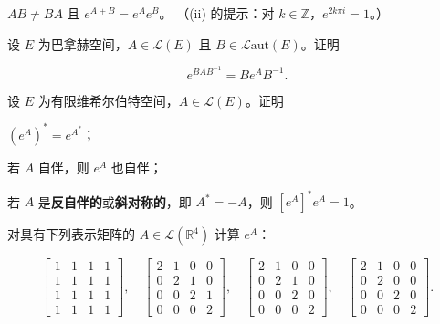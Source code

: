 \begin{exercises}
\begin{subitems}
\item

$ AB \ne BA $ 且 $ e^{A+B} = e^{A}e^{B} $。
（(ii) 的提示：对 $ k \in \mathbb{Z} $，$ e^{2k\pi i} = 1 $。）

\end{subitems}

\item

设 $ E $ 为巴拿赫空间，$ A \in \mathcal{L}(E) $ 且 $ B \in \mathcal{L}\mathrm{aut}(E) $。证明

\[
e^{BAB^{-1}} = Be^{A}B^{-1} .
\]
\item

设 $ E $ 为有限维希尔伯特空间，$ A \in \mathcal{L}(E) $。证明

\begin{subitems}
\item

$ (e^{A})^{*} = e^{A^{*}} $；

\item

若 $ A $ 自伴，则 $ e^{A} $ 也自伴；

\item

若 $ A $ 是\textbf{反自伴的}或\textbf{斜对称的}，即 $ A^{*} = -A $，则 $ [e^{A}]^{*}e^{A} = 1 $。

\end{subitems}

\item

对具有下列表示矩阵的 $ A \in \mathcal{L}(\mathbb{R}^{4}) $ 计算 $ e^{A} $：

\begin{equation*}
\begin{bmatrix} 1 & 1 & 1 & 1 \\ 1 & 1 & 1 & 1 \\ 1 & 1 & 1 & 1 \\ 1 & 1 & 1 & 1 \end{bmatrix} , \quad \begin{bmatrix} 2 & 1 & 0 & 0 \\ 0 & 2 & 1 & 0 \\ 0 & 0 & 2 & 1 \\ 0 & 0 & 0 & 2 \end{bmatrix} , \quad \begin{bmatrix} 2 & 1 & 0 & 0 \\ 0 & 2 & 1 & 0 \\ 0 & 0 & 2 & 0 \\ 0 & 0 & 0 & 2 \end{bmatrix} , \quad \begin{bmatrix} 2 & 1 & 0 & 0 \\ 0 & 2 & 0 & 0 \\ 0 & 0 & 2 & 0 \\ 0 & 0 & 0 & 2 \end{bmatrix} .
\end{equation*}
\item


\end{exercises}
